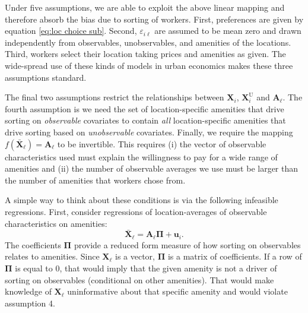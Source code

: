 \documentclass[12pt]{article}
\begin{document}
Under five assumptions, we are able to exploit the above linear mapping and therefore absorb the bias due to sorting of workers.
First, preferences are given by equation \eqref{eq:loc choice sub}.
Second, $\varepsilon_{i \ell}$ are assumed to be mean zero and drawn independently from observables, unobservables, and amenities of the locations. 
Third, workers select their location taking prices and amenities as given.
The wide-spread use of these kinds of models in urban economics makes these three assumptions standard.

The final two assumptions restrict the relationships between $\bm{X}_i$, $\bm{X}_i^{\text{U}}$ and $\bm{A}_\ell$. 
The fourth assumption is we need the set of location-specific amenities that drive sorting on \emph{observable} covariates to contain \emph{all} location-specific amenities that drive sorting based on \emph{unobservable} covariates.
Finally, we require the mapping $f( \bar{\bm{X}}_\ell ) = \bm{A}_\ell$ to be invertible. 
This requires (i) the vector of observable characteristics used must explain the willingness to pay for a wide range of amenities and (ii) the number of observable averages we use must be larger than the number of amenities that workers chose from.

A simple way to think about these conditions is via the following infeasible regressions.
First, consider regressions of location-averages of observable characteristics on amenities:
\begin{equation}\label{eq:observables_on_amenities}
    \bar{\bm{X}}_\ell = \bm{A}_\ell \bm{\Pi} + \bm{u}_i.
\end{equation}
The coefficients $\bm{\Pi}$ provide a reduced form measure of how sorting on observables relates to amenities. 
Since $\bm{X}_\ell$ is a vector, $\bm{\Pi}$ is a matrix of coefficients. 
If a row of $\bm{\Pi}$ is equal to 0, that would imply that the given amenity is not a driver of sorting on observables (conditional on other amenities).
That would make knowledge of $\bm{X}_\ell$ uninformative about that specific amenity and would violate assumption 4.  
\end{document}
